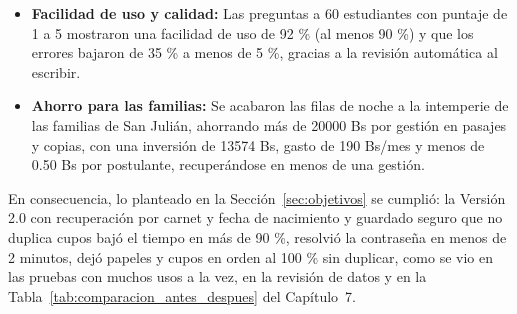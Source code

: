 \begin{itemize}
    \item \textbf{Facilidad de uso y calidad:} Las preguntas a 60 estudiantes con puntaje de 1 a 5 mostraron una facilidad de uso de 92 \% (al menos 90 \%) y que los errores bajaron de 35 \% a menos de 5 \%, gracias a la revisión automática al escribir.
    \item \textbf{Ahorro para las familias:} Se acabaron las filas de noche a la intemperie de las familias de San Julián, ahorrando más de 20000 Bs por gestión en pasajes y copias, con una inversión de 13574 Bs, gasto de 190 Bs/mes y menos de 0.50 Bs por postulante, recuperándose en menos de una gestión.
\end{itemize}

En consecuencia, lo planteado en la Sección~\ref{sec:objetivos} se cumplió: la Versión 2.0 con recuperación por carnet y fecha de nacimiento y guardado seguro que no duplica cupos bajó el tiempo en más de 90 \%, resolvió la contraseña en menos de 2 minutos, dejó papeles y cupos en orden al 100 \% sin duplicar, como se vio en las pruebas con muchos usos a la vez, en la revisión de datos y en la Tabla~\ref{tab:comparacion_antes_despues} del Capítulo~7.
